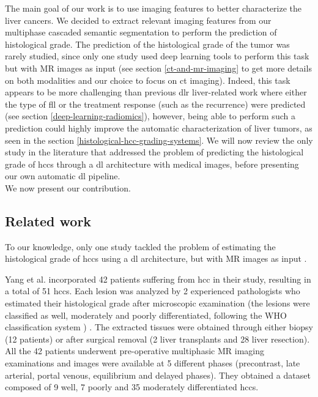 The main goal of our work is to use imaging features to better characterize the liver cancers.
We decided to extract relevant imaging features from our multiphase cascaded semantic segmentation
to perform the prediction of histological grade.
The prediction of the histological grade of the tumor was rarely studied, since only one study
used deep learning tools to perform this task but with MR images as
input \cite{Yang2019} (see section \ref{ct-and-mr-imaging} to get more details on both modalities and our choice to focus on \ac{ct} imaging).
Indeed, this task appears to be more challenging than previous \ac{dlr}
liver-related work where either the type of \ac{fll} or the treatment
response (such as the recurrence) were predicted (see section \ref{deep-learning-radiomics}), however, being able to perform such a prediction could highly improve the automatic characterization of liver tumors, as seen in the section \ref{histological-hcc-grading-systems}.
We will now review the only study in the literature that addressed the
problem of predicting the histological grade of \ac{hcc}s through a \ac{dl}
architecture with medical images, before presenting our own automatic \ac{dl}
pipeline.\\
We now present our contribution.

\subsection{Related work}\label{dlr-based-study-to-predict-the-histological-hcc-grade}

To our knowledge, only one study tackled the problem of estimating the
histological grade of \ac{hcc}s using a \ac{dl} architecture, but with MR images
as input \cite{Yang2019}.

Yang et al. incorporated 42 patients suffering from \ac{hcc} in their study,
resulting in a total of 51 \ac{hcc}s. Each lesion was analyzed by 2
experienced pathologists who estimated their histological grade after
microscopic examination (the lesions were classified as well, moderately
and poorly differentiated, following the WHO classification system \cite{20113051318}) .
The extracted tissues were obtained through either biopsy (12 patients)
or after surgical removal (2 liver transplants and 28 liver resection).
All the 42 patients underwent pre-operative multiphasic MR imaging
examinations and images were available at 5 different phases
(precontrast, late arterial, portal venous, equilibrium and delayed
phases). They obtained a dataset composed of 9 well, 7 poorly and 35 moderately
differentiated \ac{hcc}s.

